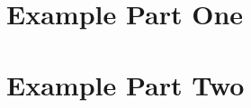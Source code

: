\documentclass[
	a4paper,
  	fontsize = 11pt,
  	BCOR = 15mm,
	DIV=10, %
  	twoside,
  	toc = bib,
  	headings=standardclasses,
  	numbers = noenddot,
  	open = right,
  	cleardoublepage = empty,
  	appendixprefix
]{scrbook}
\begin{document}
\frontmatter

\clearpage

\begingroup
	\thispagestyle{empty}

	
	\clearpage
	\thispagestyle{empty}
	
\endgroup

\cleardoublepage






\tableofcontents

\cleardoublepage

\printacronyms[template=longtable,heading=chapter*]

\cleardoubleoddpage

\mainmatter








\part{Example Part One}\label{par:one}
%



\part{Example Part Two}\label{par:two}
%






%
%
\backmatter
\setlength{\emergencystretch}{3em} %
\printbibliography
\end{document}
